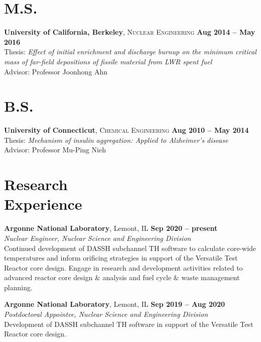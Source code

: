 \documentclass[margin,line]{resume}
\begin{document}
\begin{resume}
\section{\mysidestyle M.S.}
    \textbf{University of California, Berkeley}, 
    \textsc{Nuclear Engineering} \hfill 
    \textbf{Aug 2014 -- May 2016} \vspace{1mm} \\
    Thesis: \textsl{Effect of initial enrichment and discharge burnup on the minimum critical mass of far-field depositions of fissile material from LWR spent fuel} \\
    Advisor: Professor Joonhong Ahn

\section{\mysidestyle B.S.}
    \textbf{University of Connecticut}, 
    \textsc{Chemical Engineering} \hfill 
    \textbf{Aug 2010 -- May 2014} \vspace{1 mm} \\
    Thesis: \textsl{Mechanism of insulin aggregation: Applied to Alzheimer’s disease} \\
    Advisor: Professor Mu-Ping Nieh \\
\section{\mysidestyle Research \\ Experience}

\textbf{Argonne National Laboratory}, Lemont, IL \hfill
    \textbf{Sep 2020 -- present} \\
\textsl{Nuclear Engineer, Nuclear Science and Engineering Division} \\
Continued development of DASSH subchannel TH software to calculate core-wide temperatures and inform orificing strategies in support of the Versatile Test Reactor core design. Engage in research and development activities related to advanced reactor core design \& analysis and fuel cycle \& waste management planning.

\textbf{Argonne National Laboratory}, Lemont, IL \hfill
    \textbf{Sep 2019 -- Aug 2020} \\
\textsl{Postdoctoral Appointee, Nuclear Science and Engineering Division} \\
Development of DASSH subchannel TH software in support of the Versatile Test Reactor core design.


\end{resume}
\end{document}
